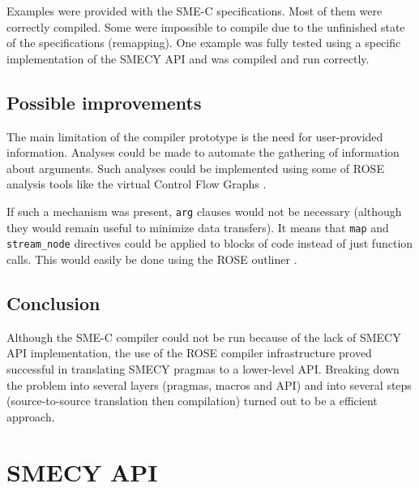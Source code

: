 \documentclass [A4]{article}
\begin{document}
	Examples were provided with the SME-C specifications. Most of them were correctly compiled. Some were impossible to compile due to the unfinished state of the specifications (remapping). One example was fully tested using a specific implementation of the SMECY API and was compiled and run correctly.
	
	\subsection{Possible improvements}
	The main limitation of the compiler prototype is the need for user-provided information. Analyses could be made to automate the gathering of information about arguments. Such analyses could be implemented using some of ROSE analysis tools like the virtual Control Flow Graphs \cite{tuto}.
	
	If such a mechanism was present, \verb+arg+ clauses would not be necessary (although they would remain useful to minimize data transfers). It means that \verb+map+ and \verb+stream_node+ directives could be applied to blocks of code instead of just function calls. This would easily be done using the ROSE outliner \cite{tuto,outliner}.
	
	\subsection{Conclusion}
	Although the SME-C compiler could not be run because of the lack of SMECY API implementation, the use of the ROSE compiler infrastructure proved successful in translating SMECY pragmas to a lower-level API. Breaking down the problem into several layers (pragmas, macros and API) and into several steps (source-to-source translation then compilation) turned out to be a efficient approach.
	
	
	\newpage
	\appendix
	\section{SMECY API}
	\label{api}
\end{document}
